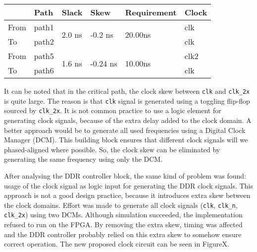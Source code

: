 \documentclass[final]{article}
\begin{document}
\begin{center}
\begin{tabular}{llllll}
     & Path  & Slack                     & Skew                        & Requirement                & Clock \\ \hline
From & path1 & \multirow{2}{3em}{2.0 ns} & \multirow{2}{3em}{-0.2 ns}  & \multirow{2}{3em}{20.00ns} & clk   \\
To   & path2 &                           &                             &                            & clk   \\ \hline
From & path5 & \multirow{2}{3em}{1.6 ns} & \multirow{2}{3em}{-0.24 ns} & \multirow{2}{3em}{10.00ns} & clk2  \\
To   & path6 &                           &                             &                            & clk   \\ \hline
\end{tabular}
\end{center}

It can be noted that in the critical path, the clock skew between \texttt{clk} and \texttt{clk\_2x} is quite large. The reason is that \texttt{clk} signal is generated using a toggling flip-flop sourced by \texttt{clk\_2x}. It is not common practice to use a logic element for generating clock signals, because of the extra delay added to the clock domain. A better approach would be to generate all used frequencies using a Digital Clock Manager (DCM). This building block ensures that different clock signals will we phased-aligned where possible. So, the clock skew can be eliminated by generating the same frequency using only the DCM.

After analysing the DDR controller block, the same kind of problem was found: usage of the clock signal as logic input for generating the DDR clock signals. This approach is not a good design practice, because it introduces extra skew between the clock domains. Effort was made to generate all clock signals (\texttt{clk}, \texttt{clk\_n}, \texttt{clk\_2x}) using two DCMs. Although simulation succeeded, the implementation refused to run on the FPGA. By removing the extra skew, timing was affected and the DDR controller probably relied on this extra skew to somehow ensure correct operation. The new proposed clock circuit can be seen in FigureX.
\end{document}
